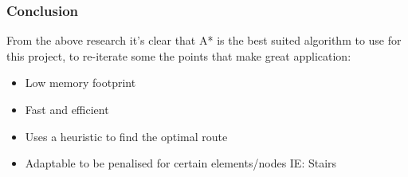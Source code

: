 \subsubsection{Conclusion}
From the above research it's clear that A* is the best suited algorithm to use for this project, to re-iterate some the points that make great application: 
\begin{itemize}
	\item Low memory footprint
	\item Fast and efficient
	\item Uses a heuristic to find the optimal route
	\item Adaptable to be penalised for certain elements/nodes IE: Stairs
\end{itemize}
